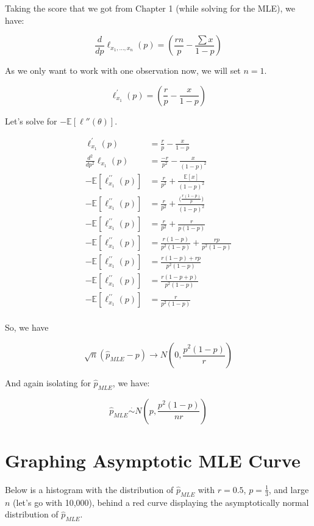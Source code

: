 \documentclass[
  letterpaper,
  DIV=11,
  numbers=noendperiod]{scrreprt}
\begin{document}
Taking the score that we got from Chapter 1 (while solving for the MLE),
we have:

\[
\frac{d}{dp} \ell_{x_1,...,x_n}(p) = \left(\frac{rn}{p} - \frac{\sum x}{1 - p} \right)
\]

As we only want to work with one observation now, we will set \(n=1\).

\[
\ell ^\prime_{x_1} (p) = \left(\frac{r}{p} - \frac{x}{1 - p} \right)
\]

Let's solve for \(-\mathbb{E}[\ell''(\theta)]\).

\[
\begin{aligned}
\ell ^\prime_{x_1} (p) &= \frac{r}{p} - \frac{x}{1 - p}  \\
\frac{d^2}{dp^2} \ell_{x_1} (p) &= \frac{-r}{p^2} - \frac{x}{(1 - p)^2} \\
-\mathbb{E}[\ell ^{\prime \prime}_{x_1} (p)] &= \frac{r}{p^2} + \frac{\mathbb{E}[x]}{(1 - p)^2} \\
-\mathbb{E}[\ell ^{\prime \prime}_{x_1} (p)] &= \frac{r}{p^2} + \frac{\Big(\frac{r(1-p)}{p}\Big)}{(1 - p)^2} \\
-\mathbb{E}[\ell ^{\prime \prime}_{x_1} (p)] &= \frac{r}{p^2} + \frac{r}{p(1 - p)} \\
-\mathbb{E}[\ell ^{\prime \prime}_{x_1} (p)] &= \frac{r(1-p)}{p^2(1-p)} + \frac{rp}{p^2(1 - p)} \\
-\mathbb{E}[\ell ^{\prime \prime}_{x_1} (p)] &= \frac{r(1-p) + rp}{p^2(1-p)}  \\
-\mathbb{E}[\ell ^{\prime \prime}_{x_1} (p)] &= \frac{r(1 - p + p)}{p^2(1-p)}  \\
-\mathbb{E}[\ell ^{\prime \prime}_{x_1} (p)] &= \frac{r}{p^2(1-p)}  \\
\end{aligned}
\]

So, we have

\[
  \sqrt{n} (\hat{p}_{MLE} - p) \rightarrow N\left(0, \frac{p^2(1-p)}{r}\right)
\]

And again isolating for \(\hat{p}_{MLE}\), we have:

\[
\hat{p}_{MLE} \overset{\cdot}{\sim} N\left(p, \frac{p^2(1-p)}{nr} \right)
\]

\section{Graphing Asymptotic MLE
Curve}\label{graphing-asymptotic-mle-curve}

Below is a histogram with the distribution of \(\hat{p}_{MLE}\) with
\(r=0.5\), \(p= \frac{1}{3}\), and large \(n\) (let's go with 10,000),
behind a red curve displaying the asymptotically normal distribution of
\(\hat{p}_{MLE}\).
\end{document}
